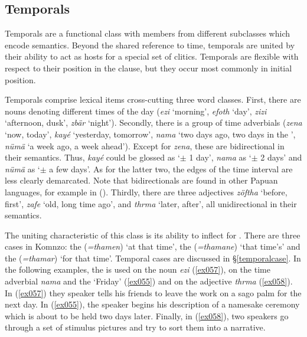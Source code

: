 \subsection{Temporals} \label{temporals}

Temporals are a functional class with members from different  subclasses which encode  semantics. Beyond the shared reference to time, temporals are united by their ability to act as hosts for a special set of   clitics. Temporals are flexible with respect to their position in the clause, but they occur most commonly in initial position.%

Temporals comprise lexical items cross-cutting three word classes. First, there are nouns denoting different times of the day (\emph{ezi} `morning', \emph{efoth} `day', \emph{zizi} `afternoon, dusk', \emph{zbär} `night'). Secondly, there is a group of time adverbials (\emph{zena} `now, today', \emph{kayé} `yesterday, tomorrow', \emph{nama} `two days ago, two days in the ', \emph{nümä} `a week ago, a week ahead'). Except for \emph{zena}, these are bidirectional in their semantics. Thus, \emph{kayé} could be glossed as `$\pm$ 1 day', \emph{nama} as `$\pm$ 2 days' and \emph{nümä} as `$\pm$ a few days'. As for the latter two, the edges of the time interval are less clearly demarcated. Note that bidirectionals are found in other Papuan languages, for example in  (\citealt[70]{Reesink:1987vg}). Thirdly, there are three adjectives \emph{zöftha} `before, first', \emph{zafe} `old, long time ago', and \emph{thrma} `later, after', all unidirectional in their semantics.%

The uniting characteristic of this class is its ability to inflect for  . There are three  cases in Komnzo: the   (\emph{=thamen}) `at that time', the   (\emph{=thamane}) `that time's' and the   (\emph{=thamar}) `for that time'. Temporal cases are discussed in \S{}\ref{temporalcase}. In the following examples, the    is used on the noun \emph{ezi} (\ref{ex057}), on the time adverbial \emph{nama} and the   `Friday' (\ref{ex055}) and on the  adjective \emph{thrma} (\ref{ex058}). In (\ref{ex057}) they speaker tells his friends to leave the work on a sago palm for the next day. In (\ref{ex055}), the speaker begins his description of a namesake ceremony which is about to be held two days later. Finally, in (\ref{ex058}), two speakers go through a set of stimulus pictures and try to sort them into a narrative.

